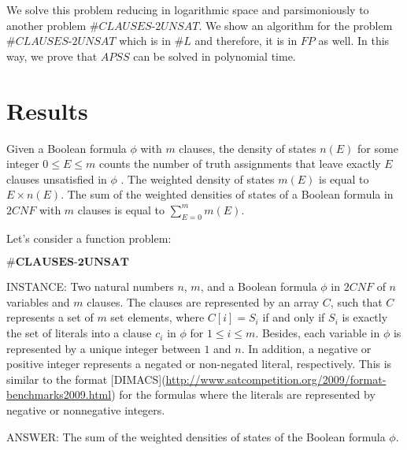 \documentclass[a4paper,UKenglish,cleveref, autoref]{lipics-v2019}
\begin{document}
We solve this problem reducing in logarithmic space and parsimoniously to another problem $\#\textit{CLAUSES-2UNSAT}$. We show an algorithm for the problem $\#\textit{CLAUSES-2UNSAT}$ which is in $\#L$ and therefore, it is in $FP$ as well. In this way, we prove that $APSS$ can be solved in polynomial time.

\section{Results}

\begin{definition}
Given a Boolean formula $\phi$ with $m$ clauses, the density of states $n(E)$ for some integer $0 \leq E \leq m$ counts the number of truth assignments that leave exactly $E$ clauses unsatisfied in $\phi$ \cite{SCB10}. The weighted density of states $m(E)$ is equal to $E \times n(E)$. The sum of the weighted densities of states of a Boolean formula in $2CNF$ with $m$ clauses is equal to $\sum_{E = 0}^{m} m(E)$.
\end{definition}

Let's consider a function problem:

\begin{definition}
\label{monotone}
$\#\textbf{CLAUSES-2UNSAT}$

INSTANCE: Two natural numbers $n$, $m$, and a Boolean formula $\phi$ in $2CNF$ of $n$ variables and $m$ clauses. The clauses are represented by an array $C$, such that $C$ represents a set of $m$ set elements, where $C[i] = S_{i}$ if and only if $S_{i}$ is exactly the set of literals into a clause $c_{i}$ in $\phi$ for $1 \leq i \leq m$. Besides, each variable in $\phi$ is represented by a unique integer between $1$ and $n$. In addition, a negative or positive integer represents a negated or non-negated literal, respectively. This is similar to the format [DIMACS](\url{http://www.satcompetition.org/2009/format-benchmarks2009.html}) for the formulas where the literals are represented by negative or nonnegative integers.

ANSWER: The sum of the weighted densities of states of the Boolean formula $\phi$.
\end{definition}
\end{document}
